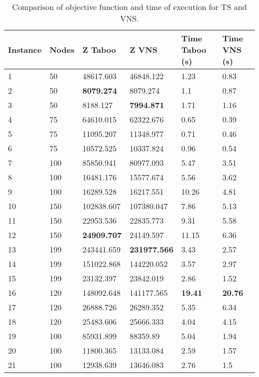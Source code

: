 \documentclass[10pt,twoside]{article}
\begin{document}
\begin{table}[H]
\centering
\begin{tabular}{llllll}
\hline
Instance & Nodes & Z Taboo    & Z VNS      & Time Taboo (s) & Time VNS (s) \\ \hline
1        & 50    & 48617.603  & 46848.122  & 1.23           & 0.83         \\
2        & 50    & \textbf{8079.274}   & 8079.274   & 1.1            & 0.87         \\
3        & 50    & 8188.127   & \textbf{7994.871}   & 1.71           & 1.16         \\
4        & 75    & 64610.015  & 62322.676  & 0.65           & 0.39         \\
5        & 75    & 11095.207  & 11348.977  & 0.71           & 0.46         \\
6        & 75    & 10572.525  & 10337.824  & 0.96           & 0.54         \\
7        & 100   & 85850.941  & 80977.093  & 5.47           & 3.51         \\
8        & 100   & 16481.176  & 15577.674  & 5.56           & 3.62         \\
9        & 100   & 16289.528  & 16217.551  & 10.26          & 4.81         \\
10       & 150   & 102838.607 & 107380.047 & 7.86           & 5.13         \\
11       & 150   & 22953.536  & 22835.773  & 9.31           & 5.58         \\
12       & 150   & \textbf{24909.707}  & 24149.597  & 11.15          & 6.36         \\
13       & 199   & 243441.659 & \textbf{231977.566} & 3.43           & 2.57         \\
14       & 199   & 151022.868 & 144220.052 & 3.57           & 2.97         \\
15       & 199   & 23132.397  & 23842.019  & 2.86           & 1.52         \\
16       & 120   & 148092.648 & 141177.565 & \textbf{19.41}          & \textbf{20.76}        \\
17       & 120   & 26888.726  & 26289.352  & 5.35           & 6.34         \\
18       & 120   & 25483.606  & 25666.333  & 4.04           & 4.15         \\
19       & 100   & 85931.899  & 88359.89   & 5.04           & 1.94         \\
20       & 100   & 11800.365  & 13133.084  & 2.59           & 1.57         \\
21       & 100   & 12938.639  & 13646.083  & 2.76           & 1.5          \\ \hline
\end{tabular}
\caption{Comparison of objective function and time of execution for TS and VNS.}
\label{tab:lsvns}
\end{table}
\end{document}
